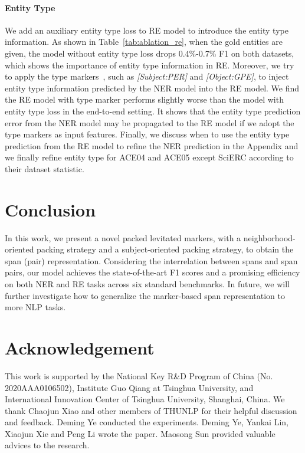 \documentclass[11pt]{article}
\begin{document}
\paragraph{Entity Type} We add an auxiliary entity type loss to RE model to introduce the entity type information. As shown in  Table~\ref{tab:ablation_re}, 
when the gold entities are given, the model without entity type loss drops 0.4\%-0.7\% F1 on both datasets, which shows the importance of entity type information in RE.  
Moreover, we try to apply the type markers~\cite{PURE}, such as \emph{[Subject:PER]} and \emph{[Object:GPE]}, to inject entity type information predicted by the NER model into the RE model. We find the RE model with type marker performs slightly worse than the model with entity type loss in the end-to-end setting. It shows that the entity type prediction error from the NER model may be propagated to the RE model if we adopt the type markers as input features. 
Finally, we discuss when to use  the entity type prediction from  the RE model to refine the NER prediction in the Appendix and we finally  refine entity type for ACE04 and ACE05 except SciERC according to their dataset statistic. 









\section{Conclusion}
In this work, we present a novel packed levitated markers, with a neighborhood-oriented packing strategy and a subject-oriented packing strategy, to obtain the span (pair) representation. Considering the interrelation between spans  and span pairs,  our model achieves the state-of-the-art F1 scores and a promising efficiency on both NER and RE tasks across six standard benchmarks. In future, we will further investigate how to generalize the marker-based span representation to more NLP tasks.

\section*{Acknowledgement}
This work is supported by the National Key R\&D Program of China (No.\,2020AAA0106502), Institute Guo Qiang at Tsinghua University, and International Innovation Center of Tsinghua University, Shanghai, China.  We thank Chaojun Xiao and other members of THUNLP for
their helpful discussion and feedback. Deming Ye conducted the experiments. Deming Ye, Yankai Lin, Xiaojun Xie and Peng Li wrote the paper. Maosong Sun provided valuable advices to the research. 
\end{document}
